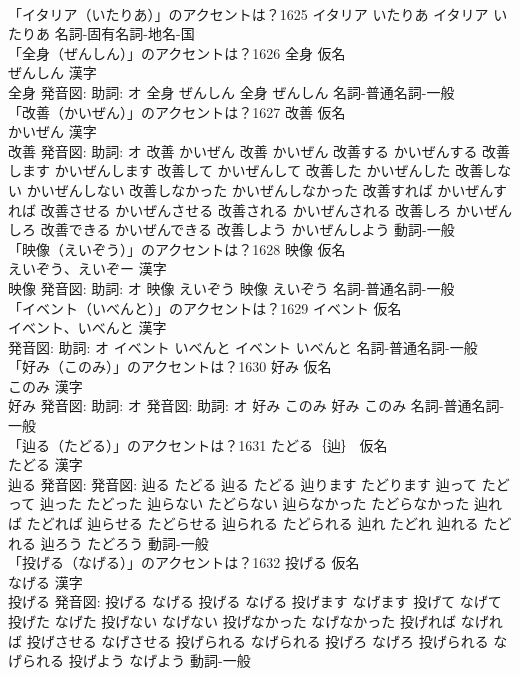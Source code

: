 \documentclass[8pt]{extreport}
\begin{document}
\begin{CJK}{UTF8}{min}
\\	「イタリア（いたりあ）」のアクセントは？1625		イタリア いたりあ		イタリア いたりあ				名詞-固有名詞-地名-国 
\\	「全身（ぜんしん）」のアクセントは？1626	全身 仮名　
\\	ぜんしん 漢字　
\\	全身 発音図: 助詞: オ	全身 ぜんしん		全身 ぜんしん				名詞-普通名詞-一般 
\\	「改善（かいぜん）」のアクセントは？1627	改善 仮名　
\\	かいぜん 漢字　
\\	改善 発音図: 助詞: オ	改善 かいぜん		改善 かいぜん 改善する かいぜんする 改善します かいぜんします 改善して かいぜんして 改善した かいぜんした 改善しない かいぜんしない 改善しなかった かいぜんしなかった 改善すれば かいぜんすれば 改善させる かいぜんさせる 改善される かいぜんされる 改善しろ かいぜんしろ 改善できる かいぜんできる 改善しよう かいぜんしよう				動詞-一般 
\\	「映像（えいぞう）」のアクセントは？1628	映像 仮名　
\\	えいぞう、えいぞー 漢字　
\\	映像 発音図: 助詞: オ	映像 えいぞう		映像 えいぞう				名詞-普通名詞-一般 
\\	「イベント（いべんと）」のアクセントは？1629	イベント 仮名　
\\	イベント、いべんと 漢字　
\\	発音図: 助詞: オ	イベント いべんと		イベント いべんと				名詞-普通名詞-一般 
\\	「好み（このみ）」のアクセントは？1630	好み 仮名　
\\	このみ 漢字　
\\	好み 発音図: 助詞: オ 発音図: 助詞: オ	好み このみ		好み このみ				名詞-普通名詞-一般 
\\	「辿る（たどる）」のアクセントは？1631	たどる｛辿｝ 仮名　
\\	たどる 漢字　
\\	辿る 発音図: 発音図:	辿る たどる		辿る たどる 辿ります たどります 辿って たどって 辿った たどった 辿らない たどらない 辿らなかった たどらなかった 辿れば たどれば 辿らせる たどらせる 辿られる たどられる 辿れ たどれ 辿れる たどれる 辿ろう たどろう				動詞-一般 
\\	「投げる（なげる）」のアクセントは？1632	投げる 仮名　
\\	なげる 漢字　
\\	投げる 発音図:	投げる なげる		投げる なげる 投げます なげます 投げて なげて 投げた なげた 投げない なげない 投げなかった なげなかった 投げれば なげれば 投げさせる なげさせる 投げられる なげられる 投げろ なげろ 投げられる なげられる 投げよう なげよう				動詞-一般 

\end{CJK}
\end{document}
